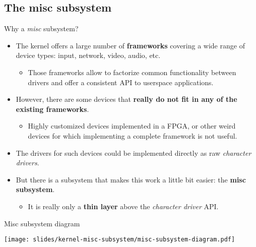 \subsection{The misc subsystem}

\begin{frame}{Why a {\em misc} subsystem?}
  \begin{itemize}
  \item The kernel offers a large number of {\bf frameworks} covering
    a wide range of device types: input, network, video, audio,
    etc.
    \begin{itemize}
    \item Those frameworks allow to factorize common functionality
      between drivers and offer a consistent API to userspace
      applications.
    \end{itemize}
  \item However, there are some devices that {\bf really do not fit in any
    of the existing frameworks}.
    \begin{itemize}
    \item Highly customized devices implemented in a FPGA, or other
      weird devices for which implementing a complete framework is not
      useful.
    \end{itemize}
  \item The drivers for such devices could be implemented directly as
    raw {\em character drivers}.
  \item But there is a subsystem that makes this work a little bit
    easier: the {\bf misc subsystem}.
    \begin{itemize}
    \item It is really only a {\bf thin layer} above the {\em character
        driver} API.
    \end{itemize}
  \end{itemize}
\end{frame}

\begin{frame}{Misc subsystem diagram}
  \begin{center}
    \texttt{[image: slides/kernel-misc-subsystem/misc-subsystem-diagram.pdf]}
  \end{center}
\end{frame}

